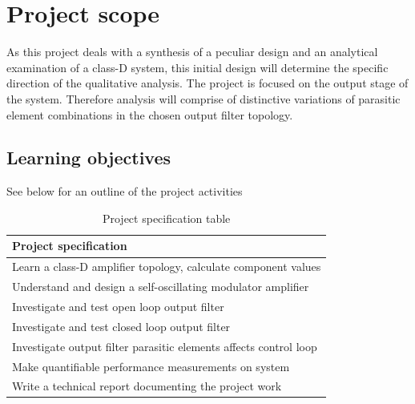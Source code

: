 %	

%

\section{Project scope}
As this project deals with a synthesis of a peculiar design and an analytical examination of a class-D system, this initial design will determine the specific direction of the qualitative analysis. The project is focused on the output stage of the system. Therefore analysis will comprise of distinctive variations of parasitic element combinations in the chosen output filter topology.

\subsection{Learning objectives}
See below for an outline of the project activities
\begin{table}[ht!]
	\centering
	\begin{tabular}{@{}l@{}}
		\toprule
		\textbf{Project specification}									\\ \midrule
		Learn a class-D amplifier topology, calculate component values	\\
		Understand and design a self-oscillating modulator amplifier	\\
		Investigate and test open loop output filter					\\
		Investigate and test closed loop output filter					\\
		Investigate output filter parasitic elements affects control loop\\
		Make quantifiable performance measurements on system			\\
		Write a technical report documenting the project work			\\ \bottomrule
	\end{tabular}
	\caption{Project specification table}
	\label{tab:specifications}
\end{table}

